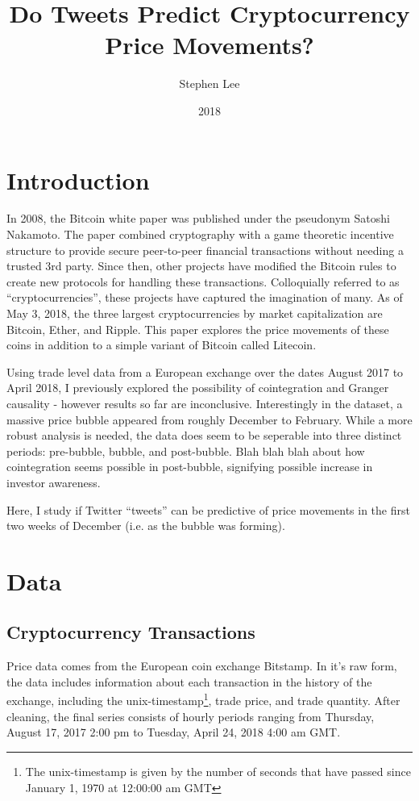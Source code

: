 \documentclass{article}
\author{Stephen Lee}
\title{Do Tweets Predict Cryptocurrency Price Movements?}
\date{2018}
\begin{document}
	\maketitle
	
	\section{Introduction}
	In 2008, the Bitcoin white paper was published under the pseudonym Satoshi Nakamoto. The paper combined cryptography with a game theoretic incentive structure to provide secure peer-to-peer financial transactions without needing a trusted 3rd party.  Since then, other projects have modified the Bitcoin rules to create new protocols for handling these transactions. Colloquially referred to as ``cryptocurrencies'', these projects have captured the imagination of many. As of May 3, 2018, the three largest cryptocurrencies by market capitalization are Bitcoin, Ether, and Ripple. This paper explores the price movements of these coins in addition to a simple variant of Bitcoin called Litecoin. 
	
	Using trade level data from a European exchange over the dates August 2017 to April 2018, I previously explored the possibility of cointegration and Granger causality - however results so far are inconclusive. Interestingly in the dataset, a massive price bubble appeared from roughly December to February. While a more robust analysis is needed, the data does seem to be seperable into three distinct periods: pre-bubble, bubble, and post-bubble. Blah blah blah about how cointegration seems possible in post-bubble, signifying possible increase in investor awareness. 
	
	Here, I study if Twitter ``tweets'' can be predictive of price movements in the first two weeks of December (i.e. as the bubble was forming). 
	
	\section{Data}
	
	\subsection{Cryptocurrency Transactions}
	Price data comes from the European coin exchange Bitstamp. In it's raw form, the data includes information about each transaction in the history of the exchange, including the unix-timestamp\footnote{The unix-timestamp is given by the number of seconds that have passed since January 1, 1970 at 12:00:00 am GMT}, trade price, and trade quantity. After cleaning, the final series consists of hourly periods ranging from Thursday, August 17, 2017 2:00 pm to Tuesday, April 24, 2018 4:00 am GMT. 
	
\end{document}
